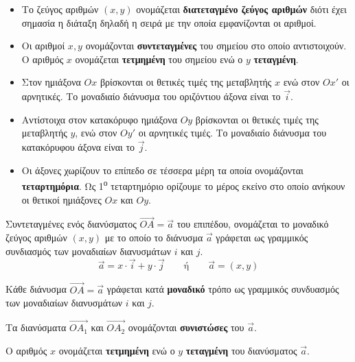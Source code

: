 \documentclass[twoside,nofonts,internet,shmeiwseis]{thewria}
\begin{document}
\vspace{-2mm}
\begin{itemize}
\item Το ζεύγος αριθμών $(x,y)$ ονομάζεται \textbf{διατεταγμένο ζεύγος αριθμών} διότι έχει σημασία η διάταξη δηλαδή η σειρά με την οποία εμφανίζονται οι αριθμοί.
\item Οι αριθμοί $x,y$ ονομάζονται \textbf{συντεταγμένες} του σημείου στο οποίο αντιστοιχούν. Ο αριθμός $x$ ονομάζεται \textbf{τετμημένη} του σημείου ενώ ο $y$ \textbf{τεταγμένη}.
\item Στον ημιάξονα $ Ox $ βρίσκονται οι θετικές τιμές της μεταβλητής $x$ ενώ στον $ Ox' $ οι αρνητικές. Το μοναδιαίο διάνυσμα του οριζόντιου άξονα είναι το $ \vec{i} $.
\item Αντίστοιχα στον κατακόρυφο ημιάξονα $ Oy $ βρίσκονται οι θετικές τιμές της μεταβλητής $y$, ενώ στον $ Oy' $ οι αρνητικές τιμές. Το μοναδιαίο διάνυσμα του κατακόρυφου άξονα είναι το $ \vec{j} $.
\item Οι άξονες χωρίζουν το επίπεδο σε τέσσερα μέρη τα οποία ονομάζονται \textbf{τεταρτημόρια}. Ως 1\textsuperscript{ο} τεταρτημόριο ορίζουμε το μέρος εκείνο στο οποίο ανήκουν οι θετικοί ημιάξονες $ Ox $ και $ Oy $.
\end{itemize}
Συντεταγμένες ενός διανύσματος $ \overrightarrow{OA}=\vec{a} $ του επιπέδου, ονομάζεται το μοναδικό ζεύγος αριθμών $ (x,y) $ με το οποίο το διάνυσμα $ \vec{a} $ γράφεται ως γραμμικός συνδιασμός των μοναδιαίων διανυσμάτων $ i $ και $ j $.
\[ \vec{a}=x\cdot\vec{i}+y\cdot\vec{j}\qquad\textrm{ή}\qquad\vec{a}=(x,y) \]
{\begin{rlist}
\item Κάθε διάνυσμα $ \overrightarrow{OA}=\vec{a} $ γράφεται κατά \textbf{μοναδικό} τρόπο ως γραμμικός συνδυασμός των μοναδιαίων διανυσμάτων $ i $ και $ j $.
\item Τα διανύσματα $ \overrightarrow{OA_1} $ και $ \overrightarrow{OA_2} $ ονομάζονται \textbf{συνιστώσες} του $ \vec{a} $.
\item Ο αριθμός $x$ ονομάζεται \textbf{τετμημένη} ενώ ο $y$ \textbf{τεταγμένη} του διανύσματος $ \vec{a} $.
\end{rlist}}\\\\
\end{document}

